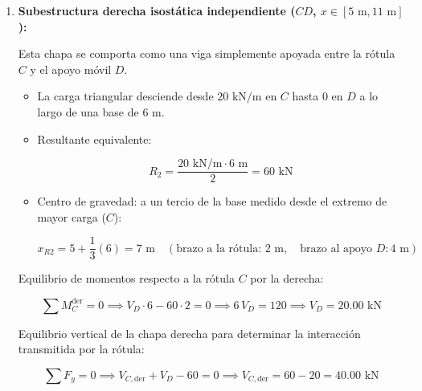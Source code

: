 \begin{enumerate}

    \item \textbf{Subestructura derecha isostática independiente ($CD$, $x \in [5\text{ m}, 11\text{ m}]$):}

          Esta chapa se comporta como una viga simplemente apoyada entre la rótula $C$ y el apoyo móvil $D$.

          \begin{itemize}

              \item La carga triangular desciende desde $20\text{ kN/m}$ en $C$ hasta $0$ en $D$ a lo largo de una base de $6\text{ m}$.

              \item Resultante equivalente:

                    \[

                        R_2 = \frac{20\text{ kN/m} \cdot 6\text{ m}}{2} = 60\text{ kN}

                    \]

              \item Centro de gravedad: a un tercio de la base medido desde el extremo de mayor carga ($C$):

                    \[

                        x_{R2} = 5 + \frac{1}{3}(6) = 7\text{ m} \quad (\text{brazo a la rótula: } 2\text{ m}, \quad \text{brazo al apoyo } D: 4\text{ m})

                    \]

          \end{itemize}

          Equilibrio de momentos respecto a la rótula $C$ por la derecha:

          \begin{equation}

              \sum M_C^{\text{der}} = 0 \implies V_D \cdot 6 - 60 \cdot 2 = 0 \implies 6\,V_D = 120 \implies \boxed{V_D = 20.00\text{ kN}}

          \end{equation}

          Equilibrio vertical de la chapa derecha para determinar la interacción transmitida por la rótula:

          \begin{equation}

              \sum F_y = 0 \implies V_{C,\text{der}} + V_D - 60 = 0 \implies V_{C,\text{der}} = 60 - 20 = 40.00\text{ kN}


\end{equation}
\end{enumerate}
